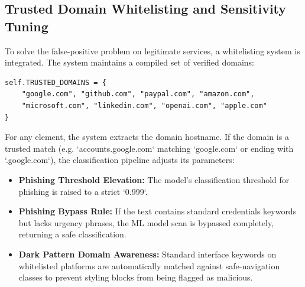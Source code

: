 \documentclass[12pt,a4paper]{report}
\begin{document}
\subsection{Trusted Domain Whitelisting and Sensitivity Tuning}
To solve the false-positive problem on legitimate services, a whitelisting system is integrated. The system maintains a compiled set of verified domains:
\begin{verbatim}
self.TRUSTED_DOMAINS = {
    "google.com", "github.com", "paypal.com", "amazon.com",
    "microsoft.com", "linkedin.com", "openai.com", "apple.com"
}
\end{verbatim}
For any element, the system extracts the domain hostname. If the domain is a trusted match (e.g. `accounts.google.com` matching `google.com` or ending with `.google.com`), the classification pipeline adjusts its parameters:
\begin{itemize}
    \item \textbf{Phishing Threshold Elevation:} The model's classification threshold for phishing is raised to a strict `0.999`.
    \item \textbf{Phishing Bypass Rule:} If the text contains standard credentials keywords but lacks urgency phrases, the ML model scan is bypassed completely, returning a safe classification.
    \item \textbf{Dark Pattern Domain Awareness:} Standard interface keywords on whitelisted platforms are automatically matched against safe-navigation classes to prevent styling blocks from being flagged as malicious.
\end{itemize}
\end{document}
